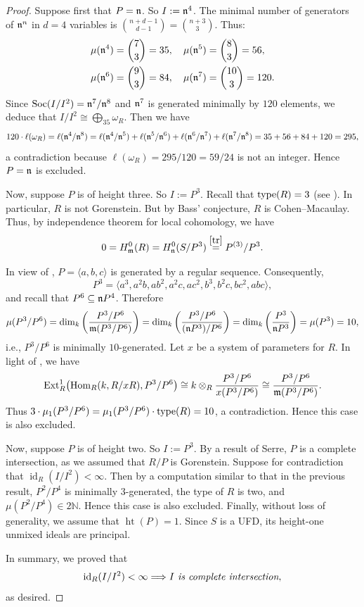 \documentclass[10. pt,a4paper]{amsart}
\theoremstyle{definition}
\theoremstyle{remark}
\newcommand{\id}{\operatorname{id}}
\newcommand{\Ext}{\operatorname{Ext}}
\newcommand{\Hom}{\operatorname{Hom}}
\newcommand{\fm}{\frak{m}}
\newcommand{\fn}{\frak{n}}
\begin{document}
\begin{proof}
	Suppose first that $P = \fn$. So $I := \fn^4$. The minimal number of generators of $\fn^n$ in $d = 4$ variables is $\binom{n+d-1}{d-1} = \binom{n+3}{3}$. Thus:
	\[
	\begin{aligned}
	\mu(\fn^4) &= \binom{7}{3} = 35, \quad \mu(\fn^5) = \binom{8}{3} = 56,\\
	\mu(\fn^6) &= \binom{9}{3} = 84, \quad \mu(\fn^7) = \binom{10}{3} = 120.
	\end{aligned}
	\]
	Since $\operatorname{Soc}(I/I^2) = \fn^7 / \fn^8$ and $\fn^7$ is generated minimally by $120$ elements, we deduce that $I/I^2 \cong \bigoplus_{35} \omega_R$. Then we have
	\[
	120 \cdot \ell(\omega_R) = \ell(\fn^4 / \fn^8) = \ell(\fn^4 / \fn^5) + \ell(\fn^5 / \fn^6) + \ell(\fn^6 / \fn^7) + \ell(\fn^7 / \fn^8) = 35 + 56 + 84 + 120 = 295,
	\]
	a contradiction because $\ell(\omega_R) = 295/120 = 59/24$ is not an integer. Hence $P = \fn$ is excluded.
	
	Now, suppose $P$ is of height three. So $I := P^3$.   Recall that $\operatorname{type}( R)=3$ (see \cite[6.6(ii)]{ini}). In particular, $R$ is not Gorenstein. But by Bass' conjecture, $R$ is Cohen--Macaulay. Thus,
by independence theorem for local cohomology, we have	\[
	0 = H^0_{\fm}(R) = H^0_{\fn}(S/P^3) \stackrel{\ref{tr}}{=} P^{(3)} / P^3.
	\]
	
	In view of \cite[Corollary 2.6]{h}, $P = \langle a, b, c \rangle$ is generated by a regular sequence. Consequently,
	\[
	P^3 = \langle a^3, a^2b, ab^2, a^2c, ac^2, b^3, b^2c, bc^2, abc \rangle,
	\]
	and recall that $P^6 \subseteq \fn P^4$. Therefore
	\[
	\mu(P^3 / P^6) = \dim_k\left(\frac{P^3 / P^6}{\fm (P^3 / P^6)}\right) = \dim_k\left(\frac{P^3 / P^6}{(\fn P^3)/ P^6}\right) = \dim_k\left(\frac{P^3}{\fn P^3}\right) = \mu(P^3) = 10,
	\]
	i.e., $P^3 / P^6$ is minimally $10$-generated. Let $x$ be a system of parameters for $R$. In light of \cite[II.5.4]{PS}, we have
	\[
	\Ext_R^1\bigl(\Hom_R(k, R/xR), P^3 / P^6\bigr) \cong k \otimes_R \frac{P^3 / P^6}{x(P^3 / P^6)} \cong \frac{P^3 / P^6}{\fm (P^3 / P^6)}.
	\]
	Thus $3 \cdot \mu_1(P^3 / P^6) = \mu_1(P^3 / P^6) \cdot \operatorname{type}(R) = 10$, a contradiction. Hence this case is also excluded.
	
	Now, suppose $P$ is of height two. So $I := P^3$. By a result of Serre, $P$ is a complete intersection, as we assumed that $R/P$ is Gorenstein. Suppose for contradiction that $\id_R(I/I^2) < \infty$. Then by a computation similar to that in the previous result, $P^2 / P^4$ is minimally $3$-generated, the type of $R$ is two, and $\mu(P^2 / P^4) \in 2\mathbb{N}$. Hence this case is also excluded.
Finally, without loss of generality, we assume that $\operatorname{ht}(P) = 1$. Since $S$ is a UFD, its height-one unmixed ideals are principal. 
	
	In summary, we proved that \[
	\id_R(I/I^2) < \infty\Longrightarrow   I \emph{ is complete intersection},
	\]as desired.
\end{proof}
\end{document}
